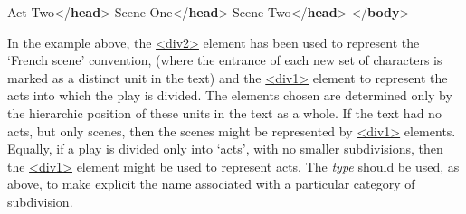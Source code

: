 \begin{shaded}
\hspace*{1em}Act Two{</\textbf{head}>}\mbox{}\newline 
\hspace*{1em}\mbox{}\newline 
\hspace*{1em}\hspace*{1em}Scene One{</\textbf{head}>}\mbox{}\newline 
\hspace*{1em}\mbox{}\newline 
\hspace*{1em}\mbox{}\newline 
\hspace*{1em}\hspace*{1em}Scene Two{</\textbf{head}>}\mbox{}\newline 
\hspace*{1em}\mbox{}\newline 
{}\mbox{}\newline 
{</\textbf{body}>}\end{shaded}\egroup\par \noindent  \par
In the example above, the \hyperref[TEI.div2]{<div2>} element has been used to represent the ‘French scene’ convention, (where the entrance of each new set of characters is marked as a distinct unit in the text) and the \hyperref[TEI.div1]{<div1>} element to represent the acts into which the play is divided. The elements chosen are determined only by the hierarchic position of these units in the text as a whole. If the text had no acts, but only scenes, then the scenes might be represented by \hyperref[TEI.div1]{<div1>} elements. Equally, if a play is divided only into ‘acts’, with no smaller subdivisions, then the \hyperref[TEI.div1]{<div1>} element might be used to represent acts. The {\itshape type} should be used, as above, to make explicit the name associated with a particular category of subdivision.\par
